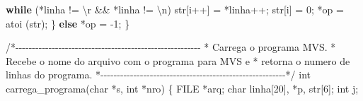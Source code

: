 \documentclass[
  brazilian,
  letterpaper,
]{book}
\newenvironment{Shaded}{\begin{snugshade}}{\end{snugshade}}
\newcommand{\CharTok}[1]{\textcolor[rgb]{0.13,0.47,0.30}{#1}}
\newcommand{\CommentTok}[1]{\textcolor[rgb]{0.37,0.37,0.37}{#1}}
\newcommand{\ControlFlowTok}[1]{\textcolor[rgb]{0.00,0.23,0.31}{\textbf{#1}}}
\newcommand{\DataTypeTok}[1]{\textcolor[rgb]{0.68,0.00,0.00}{#1}}
\newcommand{\DecValTok}[1]{\textcolor[rgb]{0.68,0.00,0.00}{#1}}
\newcommand{\NormalTok}[1]{\textcolor[rgb]{0.00,0.23,0.31}{#1}}
\newcommand{\OperatorTok}[1]{\textcolor[rgb]{0.37,0.37,0.37}{#1}}
\newcommand{\SpecialCharTok}[1]{\textcolor[rgb]{0.37,0.37,0.37}{#1}}
\theoremstyle{plain}
\theoremstyle{definition}
\theoremstyle{remark}
\begin{document}
\begin{Shaded}
\begin{Highlighting}[]
        \ControlFlowTok{while} \OperatorTok{(*}\NormalTok{linha }\OperatorTok{!=} \CharTok{\textquotesingle{}}\SpecialCharTok{\textbackslash{}r}\CharTok{\textquotesingle{}} \OperatorTok{\&\&} \OperatorTok{*}\NormalTok{linha }\OperatorTok{!=} \CharTok{\textquotesingle{}}\SpecialCharTok{\textbackslash{}n}\CharTok{\textquotesingle{}}\OperatorTok{)}
\NormalTok{          str}\OperatorTok{[}\NormalTok{i}\OperatorTok{++]} \OperatorTok{=} \OperatorTok{*}\NormalTok{linha}\OperatorTok{++;}
\NormalTok{        str}\OperatorTok{[}\NormalTok{i}\OperatorTok{]} \OperatorTok{=} \DecValTok{0}\OperatorTok{;}
        \OperatorTok{*}\NormalTok{op }\OperatorTok{=}\NormalTok{ atoi }\OperatorTok{(}\NormalTok{str}\OperatorTok{);}
    \OperatorTok{\}}
    \ControlFlowTok{else} \OperatorTok{*}\NormalTok{op }\OperatorTok{=} \OperatorTok{{-}}\DecValTok{1}\OperatorTok{;}
\OperatorTok{\}}

\CommentTok{/*{-}{-}{-}{-}{-}{-}{-}{-}{-}{-}{-}{-}{-}{-}{-}{-}{-}{-}{-}{-}{-}{-}{-}{-}{-}{-}{-}{-}{-}{-}{-}{-}{-}{-}{-}{-}{-}{-}{-}{-}{-}{-}{-}{-}{-}{-}{-}{-}{-}{-}{-}{-}{-}{-}{-}{-}}
\CommentTok{ * Carrega o programa MVS. }
\CommentTok{ * Recebe o nome do arquivo com o programa para MVS e}
\CommentTok{ * retorna o numero de linhas do programa. }
\CommentTok{ *{-}{-}{-}{-}{-}{-}{-}{-}{-}{-}{-}{-}{-}{-}{-}{-}{-}{-}{-}{-}{-}{-}{-}{-}{-}{-}{-}{-}{-}{-}{-}{-}{-}{-}{-}{-}{-}{-}{-}{-}{-}{-}{-}{-}{-}{-}{-}{-}{-}{-}{-}{-}{-}{-}{-}{-}*/}
\DataTypeTok{int}\NormalTok{ carrega\_programa}\OperatorTok{(}\DataTypeTok{char} \OperatorTok{*}\NormalTok{s}\OperatorTok{,} \DataTypeTok{int} \OperatorTok{*}\NormalTok{nro}\OperatorTok{)}
\OperatorTok{\{}
    \DataTypeTok{FILE} \OperatorTok{*}\NormalTok{arq}\OperatorTok{;}
    \DataTypeTok{char}\NormalTok{ linha}\OperatorTok{[}\DecValTok{20}\OperatorTok{],} \OperatorTok{*}\NormalTok{p}\OperatorTok{,}\NormalTok{ str}\OperatorTok{[}\DecValTok{6}\OperatorTok{];}
    \DataTypeTok{int}\NormalTok{ j}\OperatorTok{;}


\end{Highlighting}
\end{Shaded}
\end{document}
